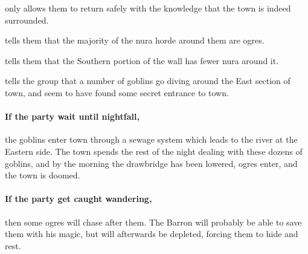 \begin{multicols}{2}
\setcounter{list}{-1}
\begin{list}{\addtocounter{list}{1}\textbf{Margin }:}{\raggedleft}

	\item{only allows them to return safely with the knowledge that the town is indeed surrounded.}
	\item{tells them that the majority of the nura horde around them are ogres.}
	\item{tells them that the Southern portion of the wall has fewer nura around it.}
	\item{tells the group that a number of goblins go diving around the East section of town, and seem to have found some secret entrance to town.}
\end{list}

\paragraph{If the party wait until nightfall,}
the goblins enter town through a sewage system which leads to the river at the Eastern side.
The town spends the rest of the night dealing with these dozens of goblins, and by the morning the drawbridge has been lowered, ogres enter, and the town is doomed.

\paragraph{If the party get caught wandering,}
then some ogres will chase after them.
The Barron will probably be able to save them with his magic, but will afterwards be depleted, forcing them to hide and rest.

\ogre

\end{multicols}
